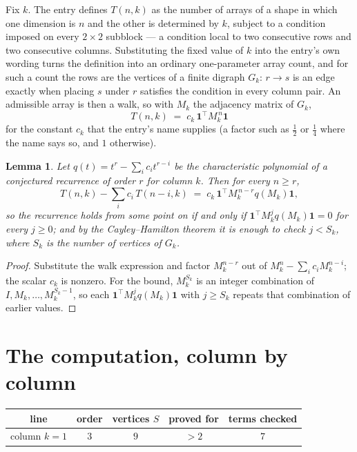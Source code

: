 \documentclass[11pt,a4paper]{article}
\theoremstyle{plain}
\newtheorem{lemma}[theorem]{Lemma}
\theoremstyle{definition}
\begin{document}
Fix $k$. The entry defines $T(n,k)$ as the number of arrays of a shape in which one dimension
is $n$ and the other is determined by $k$, subject to a condition imposed on every
$2\times2$ subblock --- a condition local to two consecutive rows and two consecutive columns.
Substituting the fixed value of $k$ into the entry's own wording turns the definition into an
ordinary one-parameter array count, and for such a count the rows are the vertices of a finite
digraph $G_k$: $r\to s$ is an edge exactly when placing $s$ under $r$ satisfies the condition
in every column pair. An admissible array is then a walk, so with $M_k$ the adjacency matrix
of $G_k$,
\[
T(n,k)\;=\;c_k\,\mathbf{1}^{\!\top}M_k^{\,n}\mathbf{1}
\]
for the constant $c_k$ that the entry's name supplies (a factor such as $\tfrac12$ or
$\tfrac14$ where the name says so, and $1$ otherwise).

\begin{lemma}\label{lem:crit}
Let $q(t)=t^{r}-\sum_i c_it^{r-i}$ be the characteristic polynomial of a conjectured
recurrence of order $r$ for column $k$. Then for every $n\ge r$,
\[
T(n,k)-\sum_i c_i\,T(n-i,k)\;=\;c_k\,\mathbf{1}^{\!\top}M_k^{\,n-r}q(M_k)\mathbf{1},
\]
so the recurrence holds from some point on if and only if
$\mathbf{1}^{\!\top}M_k^{j}q(M_k)\mathbf{1}=0$ for every $j\ge0$; and by the
Cayley--Hamilton theorem it is enough to check $j<S_k$, where $S_k$ is the number of vertices
of $G_k$.
\end{lemma}

\begin{proof}
Substitute the walk expression and factor $M_k^{n-r}$ out of $M_k^{n}-\sum_ic_iM_k^{n-i}$;
the scalar $c_k$ is nonzero. For the bound, $M_k^{S_k}$ is an integer combination of
$I,M_k,\dots,M_k^{S_k-1}$, so each $\mathbf{1}^{\!\top}M_k^{j}q(M_k)\mathbf{1}$ with
$j\ge S_k$ repeats that combination of earlier values.
\end{proof}

\section{The computation, column by column}

\begin{center}
\begin{tabular}{ccccc}
line & order & vertices $S$ & proved for & terms checked \\ \hline
column $k$$=1$ & $3$ & $9$ & $>2$ & $7$ \\
\end{tabular}
\end{center}
\end{document}
